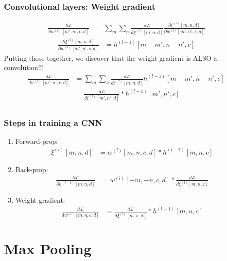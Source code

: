 \documentclass{beamer}
\begin{document}
\begin{frame}
  \frametitle{Convolutional layers: Weight gradient}

  \begin{align*}
    \frac{\partial{\mathcal L}}{\partial w^{(l)}[m',n',c,d]} &=
    \sum_{m}\sum_n\frac{d{\mathcal L}}{d\xi^{(l)}[m,n,d]}
    \frac{\partial\xi^{(l)}[m,n,d]}{\partial w^{(l)}[m',n',c,d]}
  \end{align*}
  \begin{align*}
    \frac{\partial\xi^{(l)}[m,n,d]}{\partial w^{(l)}[m',n',c,d]} &= h^{(l-1)}[m-m',n-n',c]
  \end{align*}
  Putting those together, we discover that the weight gradient is ALSO a convolution!!!
  \begin{align*}
    \frac{d{\mathcal L}}{dw^{(l)}[m',n',c,d]} &=
    \sum_{m}\sum_n \frac{d{\mathcal L}}{d\xi^{(l)}[m,n,d]}h^{(l-1)}[m-m',n-n',c]\\
    &= \frac{d{\mathcal L}}{d\xi^{(l)}[m',n',d]} \ast h^{(l-1)}[m',n',c]\\
  \end{align*}
\end{frame}

\begin{frame}
  \frametitle{Steps in training a CNN}
  \begin{enumerate}
  \item Forward-prop:
    \begin{align*}
      \xi^{(l)}[m,n,d] &= w^{(l)}[m,n,c,d] \ast h^{(l-1)}[m,n,c]
    \end{align*}
  \item Back-prop:
    \begin{align*}
      \frac{\partial{\mathcal L}}{\partial h^{(l-1)}[m,n,d]} &=
      w^{(l)}[-m,-n,c,d] \ast \frac{d{\mathcal L}}{d\xi^{(l)}[m,n,c]}
    \end{align*}
  \item Weight gradient:
    \begin{align*}
      \frac{d{\mathcal L}}{dw^{(l)}[m,n,c,d]} &=
      \frac{d{\mathcal L}}{d\xi^{(l)}[m,n,d]} \ast h^{(l-1)}[m,n,c]
    \end{align*}
  \end{enumerate}
\end{frame}

\section{Max Pooling}
\setcounter{subsection}{1}
\end{document}
